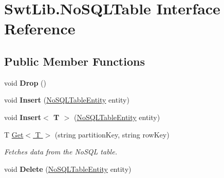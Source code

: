 \hypertarget{interface_swt_lib_1_1_no_s_q_l_table}{\section{Swt\-Lib.\-No\-S\-Q\-L\-Table Interface Reference}
\label{interface_swt_lib_1_1_no_s_q_l_table}
}
\subsection*{Public Member Functions}
\begin{DoxyCompactItemize}
\item 
\hypertarget{interface_swt_lib_1_1_no_s_q_l_table_a9b42e3a43065b3231454c33c90280caf}{void {\bfseries Drop} ()}\label{interface_swt_lib_1_1_no_s_q_l_table_a9b42e3a43065b3231454c33c90280caf}

\item 
\hypertarget{interface_swt_lib_1_1_no_s_q_l_table_a6f49d096b6f92580a3dbbf6a368fe4ba}{void {\bfseries Insert} (\hyperlink{class_swt_lib_1_1_no_s_q_l_table_entity}{No\-S\-Q\-L\-Table\-Entity} entity)}\label{interface_swt_lib_1_1_no_s_q_l_table_a6f49d096b6f92580a3dbbf6a368fe4ba}

\item 
\hypertarget{interface_swt_lib_1_1_no_s_q_l_table_a172cb998544a42ca9379d492ab54ceba}{void {\bfseries Insert$<$ T $>$} (\hyperlink{class_swt_lib_1_1_no_s_q_l_table_entity}{No\-S\-Q\-L\-Table\-Entity} entity)}\label{interface_swt_lib_1_1_no_s_q_l_table_a172cb998544a42ca9379d492ab54ceba}

\item 
T \hyperlink{interface_swt_lib_1_1_no_s_q_l_table_a5cc749a886e8f0d7b1023f7a75f713bb}{Get$<$ T $>$} (string partition\-Key, string row\-Key)
\begin{DoxyCompactList}\small\item\em Fetches data from the No\-S\-Q\-L table. \end{DoxyCompactList}\item 
\hypertarget{interface_swt_lib_1_1_no_s_q_l_table_aa04b469df6c164ec2bed3ea86ec37438}{void {\bfseries Delete} (\hyperlink{class_swt_lib_1_1_no_s_q_l_table_entity}{No\-S\-Q\-L\-Table\-Entity} entity)}\label{interface_swt_lib_1_1_no_s_q_l_table_aa04b469df6c164ec2bed3ea86ec37438}

\end{DoxyCompactItemize}


